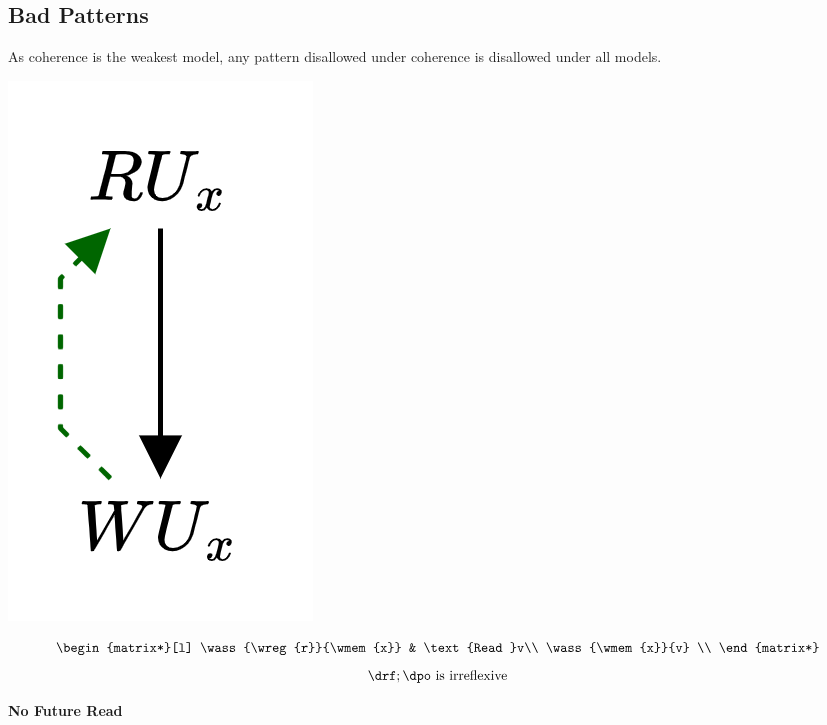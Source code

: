 \subsection{Bad Patterns}
As coherence is the weakest model, any pattern disallowed under coherence is disallowed under all models.
\\ \begin{minipage}[b]{.33\textwidth}
	\begin{center}
		\includegraphics[scale=.15]{declarative_semantics/images/bad_patterns_no_future_read.drawio.png}
	\end{center}
	\[
		\begin{matrix*}[l]
			\wass{\wreg{r}}{\wmem{x}} & \text{Read }v\\
			\wass{\wmem{x}}{v} \\
		\end{matrix*}
	\]
	\[\drf ; \dpo \text{ is irreflexive}\]
	\centerline{\textbf{No Future Read}}
\end{minipage}
